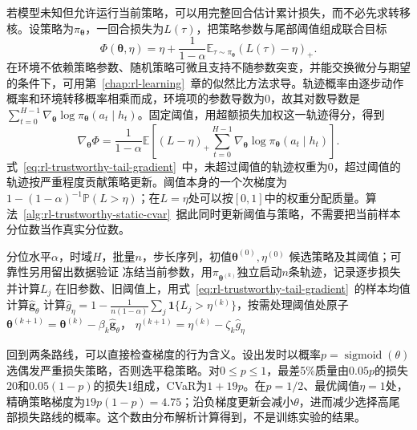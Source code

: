 若模型未知但允许运行当前策略，可以用完整回合估计累计损失，而不必先求转移核。设策略为$\pi_{\bm{\theta}}$，一回合损失为$L(\tau)$，把策略参数与尾部阈值组成联合目标
\[
  \Phi(\bm{\theta},\eta)
  =\eta+\frac{1}{1-\alpha}
      \mathbb E_{\tau\sim\pi_{\bm{\theta}}}(L(\tau)-\eta)_+.
\]
在环境不依赖策略参数、随机策略可微且支持不随参数突变，并能交换微分与期望的条件下，可用第~\ref{chap:rl-learning}~章的似然比方法求导。轨迹概率由逐步动作概率和环境转移概率相乘而成，环境项的参数导数为0，故其对数导数是
$\sum_{t=0}^{H-1}\nabla_{\bm{\theta}}\log\pi_{\bm{\theta}}(a_t\mid h_t)$。固定阈值，用超额损失加权这一轨迹得分，得到
\begin{equation}
  \nabla_{\bm{\theta}}\Phi
  =\frac{1}{1-\alpha}\mathbb E\left[
    (L-\eta)_+
    \sum_{t=0}^{H-1}\nabla_{\bm{\theta}}
       \log\pi_{\bm{\theta}}(a_t\mid h_t)\right].
  \label{eq:rl-trustworthy-tail-gradient}
\end{equation}
式~\eqref{eq:rl-trustworthy-tail-gradient}~中，未超过阈值的轨迹权重为0，超过阈值的轨迹按严重程度贡献策略更新。阈值本身的一个次梯度为
$1-(1-\alpha)^{-1}\mathbb P(L>\eta)$；在$L=\eta$处可以按$[0,1]$中的权重分配质量。算法~\ref{alg:rl-trustworthy-static-cvar}~据此同时更新阈值与策略，不需要把当前样本分位数当作真实分位数。

\begin{algorithm}[累计CVaR的轨迹更新]
  \label{alg:rl-trustworthy-static-cvar}
  \begin{algorithmic}[1]
    \Require 分位水平$\alpha$，时域$H$，批量$n$，步长序列，初值$\bm{\theta}^{(0)},\eta^{(0)}$
    \Ensure 候选策略及其阈值；可靠性另用留出数据验证
      \State 冻结当前参数，用$\pi_{\bm{\theta}^{(k)}}$独立启动$n$条轨迹，记录逐步损失并计算$L_j$
      \State 在旧参数、旧阈值上，用式~\eqref{eq:rl-trustworthy-tail-gradient}~的样本均值计算$\widehat{\bm{g}}_\theta$
      \State 计算$\widehat g_\eta=1-\frac{1}{n(1-\alpha)}\sum_j\mathbf 1\{L_j>\eta^{(k)}\}$，按需处理阈值处原子
      \State $\bm{\theta}^{(k+1)}=\bm{\theta}^{(k)}-\beta_k\widehat{\bm{g}}_\theta$，
        $\eta^{(k+1)}=\eta^{(k)}-\zeta_k\widehat g_\eta$
    \EndFor
  \end{algorithmic}
\end{algorithm}

回到两条路线，可以直接检查梯度的行为含义。设出发时以概率$p=\operatorname{sigmoid}(\theta)$选偶发严重损失策略，否则选平稳策略。对$0\leq p\leq1$，最差5\%质量由$0.05p$的损失20和$0.05(1-p)$的损失1组成，CVaR为$1+19p$。在$p=1/2$、最优阈值$\eta=1$处，精确策略梯度为$19p(1-p)=4.75$；沿负梯度更新会减小$\theta$，进而减少选择高尾部损失路线的概率。这个数由分布解析计算得到，不是训练实验的结果。

